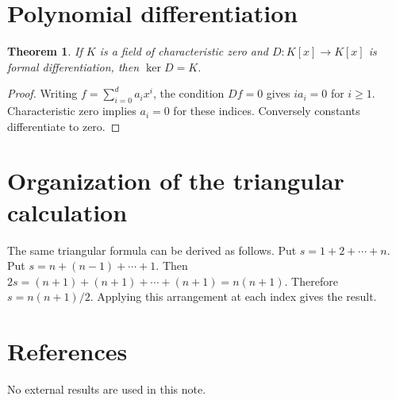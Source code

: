 \documentclass{article}
\newtheorem{theorem}{Theorem}
\begin{document}
\section{Polynomial differentiation}
\begin{theorem}\label{thm:derivative}
If $K$ is a field of characteristic zero and $D:K[x]\to K[x]$ is
formal differentiation, then $\ker D=K$.
\end{theorem}
\begin{proof}
Writing $f=\sum_{i=0}^d a_i x^i$, the condition $Df=0$ gives $ia_i=0$
for $i\geq1$. Characteristic zero implies $a_i=0$ for these indices.
Conversely constants differentiate to zero.
\end{proof}
\section{Organization of the triangular calculation}
The same triangular formula can be derived as follows. Put
$s=1+2+\cdots+n$. Put $s=n+(n-1)+\cdots+1$. Then
$2s=(n+1)+(n+1)+\cdots+(n+1)=n(n+1)$. Therefore
$s=n(n+1)/2$. Applying this arrangement at each index gives the result.
\section*{References}
No external results are used in this note.
\end{document}
